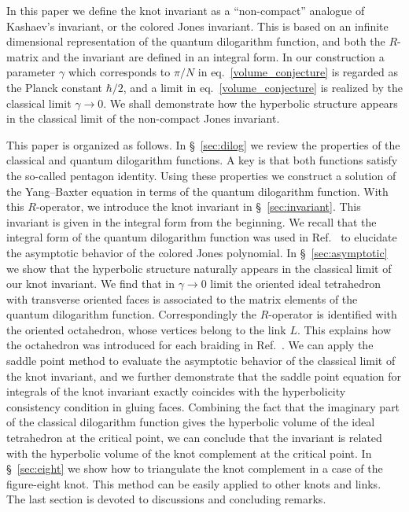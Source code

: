 \documentclass[12pt]{article}
\numberwithin{equation}{section}
\begin{document}
In this paper we define the knot invariant
as a ``non-compact'' analogue of Kashaev's invariant, or the colored
Jones invariant.
This is based on an infinite dimensional representation of the quantum
dilogarithm function, and
both the $R$-matrix and  the invariant  are  defined in an integral form.
In our construction a    parameter $\gamma$ which corresponds to
$\pi/N$ in eq.~\eqref{volume_conjecture} is regarded as
the Planck constant $\hbar/2$, and a limit in
eq.~\eqref{volume_conjecture} is realized by the classical limit
$\gamma \to 0$.
We shall  demonstrate how the hyperbolic structure
appears in the classical limit of the non-compact Jones invariant.


This paper is organized as follows.
In \S~\ref{sec:dilog} we review the properties of the classical and
quantum dilogarithm functions.
A key is that both functions satisfy the so-called pentagon identity.
Using these properties
we   construct a solution of the Yang--Baxter equation in terms
of the quantum dilogarithm function.
With this  $R$-operator, we introduce  the knot invariant in
\S~\ref{sec:invariant}.
This invariant is given  in the integral form from the beginning.
We recall that the integral form of the quantum dilogarithm function
was used in Ref.~ to elucidate the asymptotic
behavior of the colored Jones polynomial.
In \S~\ref{sec:asymptotic} we show that the hyperbolic structure
naturally appears in the classical limit of  our knot invariant.
We find that
in  $\gamma\to 0$ limit
the oriented ideal tetrahedron with transverse oriented faces is
associated to  the matrix elements of the quantum dilogarithm
function.
Correspondingly the $R$-operator is identified with the oriented
octahedron, whose vertices belong to the link $L$.
This explains how the octahedron was introduced for each braiding  in
Ref.~.
We can apply the saddle point method to evaluate the asymptotic
behavior of the classical limit of the knot invariant, and
we further demonstrate that the   saddle point equation for  integrals
of the knot invariant exactly coincides with the hyperbolicity
consistency condition in gluing faces.
Combining the fact that the imaginary part of the classical
dilogarithm function gives the hyperbolic volume of the ideal
tetrahedron at the critical point,
we can  conclude that the  invariant is related with the hyperbolic
volume of the knot complement
at the critical point.
In \S~\ref{sec:eight}
we show how to triangulate the knot complement in a case of the
figure-eight knot.
This method can be easily applied to other knots and links.
The last section is devoted to discussions and concluding remarks.
\end{document}
